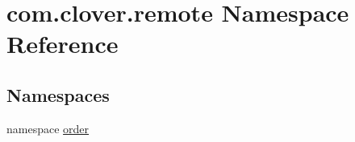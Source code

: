 \hypertarget{namespacecom_1_1clover_1_1remote}{}\section{com.\+clover.\+remote Namespace Reference}
\label{namespacecom_1_1clover_1_1remote}
\subsection*{Namespaces}
\begin{DoxyCompactItemize}
\item 
namespace \hyperlink{namespacecom_1_1clover_1_1remote_1_1order}{order}
\end{DoxyCompactItemize}
